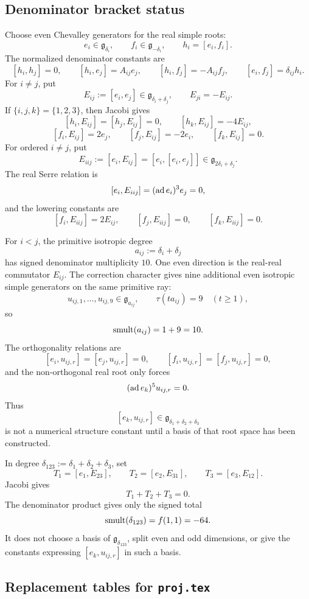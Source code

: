\subsection{Denominator bracket status}

Choose even Chevalley generators for the real simple roots:
$$
e_i\in\mathfrak g_{\delta_i},\qquad
f_i\in\mathfrak g_{-\delta_i},\qquad
h_i=[e_i,f_i].
$$
The normalized denominator constants are
$$
[h_i,h_j]=0,\qquad
[h_i,e_j]=A_{ij}e_j,\qquad
[h_i,f_j]=-A_{ij}f_j,\qquad
[e_i,f_j]=\delta_{ij}h_i.
$$
For \(i\neq j\), put
$$
E_{ij}:=[e_i,e_j]\in\mathfrak g_{\delta_i+\delta_j},
\qquad E_{ji}=-E_{ij}.
$$
If \(\{i,j,k\}=\{1,2,3\}\), then Jacobi gives
$$
[h_i,E_{ij}]=[h_j,E_{ij}]=0,\qquad
[h_k,E_{ij}]=-4E_{ij},
$$
$$
[f_i,E_{ij}]=2e_j,\qquad
[f_j,E_{ij}]=-2e_i,\qquad
[f_k,E_{ij}]=0.
$$
For ordered \(i\neq j\), put
$$
E_{iij}:=[e_i,E_{ij}]=[e_i,[e_i,e_j]]
\in\mathfrak g_{2\delta_i+\delta_j}.
$$
The real Serre relation is
$$
[e_i,E_{iij}]=(\operatorname{ad} e_i)^3e_j=0,
$$
and the lowering constants are
$$
[f_i,E_{iij}]=2E_{ij},\qquad
[f_j,E_{iij}]=0,\qquad
[f_k,E_{iij}]=0.
$$

For \(i<j\), the primitive isotropic degree
$$
a_{ij}:=\delta_i+\delta_j
$$
has signed denominator multiplicity \(10\).  One even direction is the
real-real commutator \(E_{ij}\).  The correction character gives nine
additional even isotropic simple generators on the same primitive ray:
$$
u_{ij,1},\ldots,u_{ij,9}\in\mathfrak g_{a_{ij}},
\qquad \tau(ta_{ij})=9\quad(t\geq1),
$$
so
$$
\operatorname{smult}(a_{ij})=1+9=10.
$$
The orthogonality relations are
$$
[e_i,u_{ij,r}]=[e_j,u_{ij,r}]=0,\qquad
[f_i,u_{ij,r}]=[f_j,u_{ij,r}]=0,
$$
and the non-orthogonal real root only forces
$$
(\operatorname{ad} e_k)^5u_{ij,r}=0.
$$
Thus
$$
[e_k,u_{ij,r}]
\in\mathfrak g_{\delta_1+\delta_2+\delta_3}
$$
is not a numerical structure constant until a basis of that root space
has been constructed.

In degree \(\delta_{123}:=\delta_1+\delta_2+\delta_3\), set
$$
T_1=[e_1,E_{23}],\qquad
T_2=[e_2,E_{31}],\qquad
T_3=[e_3,E_{12}].
$$
Jacobi gives
$$
T_1+T_2+T_3=0.
$$
The denominator product gives only the signed total
$$
\operatorname{smult}(\delta_{123})=f(1,1)=-64.
$$
It does not choose a basis of
\(\mathfrak g_{\delta_{123}}\), split even and odd dimensions, or give
the constants expressing \([e_k,u_{ij,r}]\) in such a basis.

\subsection{Replacement tables for \texttt{proj.tex}}

